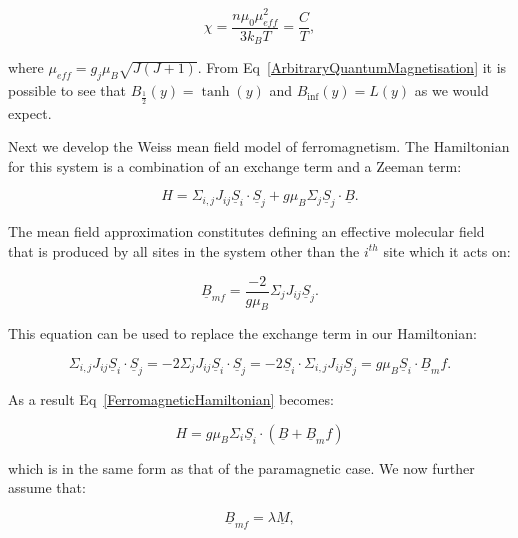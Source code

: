 \begin{equation}
    \chi = \frac{n \mu_0 \mu_{eff}^2}{3 k_B T} = \frac{C}{T},
    \label{ArbitraryQuantumSusceptibility}
\end{equation}

\noindent where $\mu_{eff} = g_j \mu_B \sqrt{J(J + 1)}$. From Eq~\ref{ArbitraryQuantumMagnetisation} it is possible to see that $B_{\frac{1}{2}}(y) = \tanh(y)$ and $B_{\inf}(y) = L(y)$ as we would expect.

\noindent Next we develop the Weiss mean field model of ferromagnetism. The Hamiltonian for this system is a combination of an exchange term and a Zeeman term:

\begin{equation}
    H = \Sigma_{i,j} J_{ij} \underline{S}_i \cdot \underline{S}_j + g \mu_B \Sigma_j \underline{S}_j \cdot \underline{B}.
    \label{FerromagneticHamiltonian}
\end{equation}

\noindent The mean field approximation constitutes defining an effective molecular field that is produced by all sites in the system other than the $i^{th}$ site which it acts on:

\begin{equation}
    \underline{B}_{mf} = \frac{-2}{g \mu_B} \Sigma_j J_{ij} \underline{S}_j
    \label{MeanField}.
\end{equation}

\noindent This equation can be used to replace the exchange term in our Hamiltonian:

\begin{equation}
    \Sigma_{i,j} J_{ij} \underline{S}_i \cdot \underline{S}_j = -2 \Sigma_{j} J_{ij} \underline{S}_i \cdot \underline{S}_j = -2 \underline{S}_i \cdot \Sigma_{i,j} J_{ij} \underline{S}_j = g \mu_B \underline{S}_i \cdot \underline{B}_mf.
\end{equation}

\noindent As a result Eq~\ref{FerromagneticHamiltonian} becomes:

\begin{equation}
    H = g \mu_B \Sigma_i \underline{S}_i \cdot (\underline{B} + \underline{B}_mf)
    \label{MeanFieldHamiltonian}
\end{equation}

\noindent which is in the same form as that of the paramagnetic case. We now further assume that:

\begin{equation}
    \underline{B}_{mf} = \lambda \underline{M},
    \label{MeanFieldAssumption}
\end{equation}

